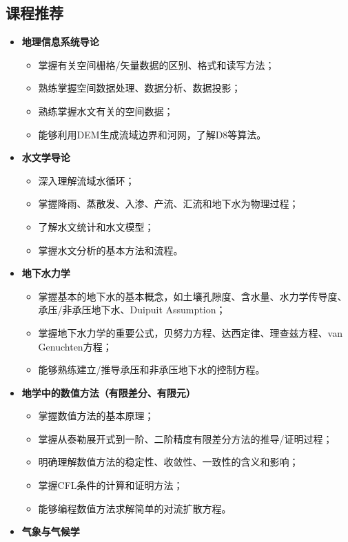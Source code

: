 \documentclass[
]{ctexbook}
\providecommand{\tightlist}{%
  \setlength{\itemsep}{0pt}\setlength{\parskip}{0pt}}
\begin{document}
\hypertarget{ux8bfeux7a0bux63a8ux8350}{%
\subsection{课程推荐}\label{ux8bfeux7a0bux63a8ux8350}}

\begin{itemize}
\tightlist
\item
  \textbf{地理信息系统导论}

  \begin{itemize}
  \tightlist
  \item
    掌握有关空间栅格/矢量数据的区别、格式和读写方法；
  \item
    熟练掌握空间数据处理、数据分析、数据投影；
  \item
    熟练掌握水文有关的空间数据；
  \item
    能够利用DEM生成流域边界和河网，了解D8等算法。
  \end{itemize}
\item
  \textbf{水文学导论}

  \begin{itemize}
  \tightlist
  \item
    深入理解流域水循环；
  \item
    掌握降雨、蒸散发、入渗、产流、汇流和地下水为物理过程；
  \item
    了解水文统计和水文模型；
  \item
    掌握水文分析的基本方法和流程。
  \end{itemize}
\item
  \textbf{地下水力学}

  \begin{itemize}
  \tightlist
  \item
    掌握基本的地下水的基本概念，如土壤孔隙度、含水量、水力学传导度、承压/非承压地下水、Duipuit Assumption；
  \item
    掌握地下水力学的重要公式，贝努力方程、达西定律、理查兹方程、van Genuchten方程；
  \item
    能够熟练建立/推导承压和非承压地下水的控制方程。
  \end{itemize}
\item
  \textbf{地学中的数值方法（有限差分、有限元）}

  \begin{itemize}
  \tightlist
  \item
    掌握数值方法的基本原理；
  \item
    掌握从泰勒展开式到一阶、二阶精度有限差分方法的推导/证明过程；
  \item
    明确理解数值方法的稳定性、收敛性、一致性的含义和影响；
  \item
    掌握CFL条件的计算和证明方法；
  \item
    能够编程数值方法求解简单的对流扩散方程。
  \end{itemize}
\item
  \textbf{气象与气候学}


\end{itemize}
\end{document}
